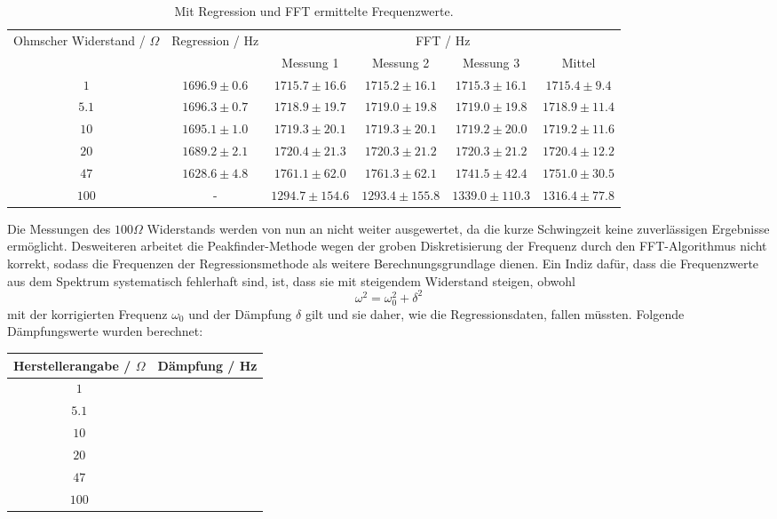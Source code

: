 \documentclass[a4paper, 12pt]{scrartcl}
\begin{document}
\begin{table}[H]
\centering
\begin{adjustbox}{width=\textwidth}
\begin{tabular}{c|c|cccc}
\multirow{2}{*}{Ohmscher Widerstand / $\Omega$} & \multirow{2}{*}{Regression / Hz} & \multicolumn{4}{c}{FFT / Hz} \\
\cline{3-6}
& & Messung 1 & Messung 2 & Messung 3 & Mittel\\
\hline
$1$ & $1696.9 \pm 0.6$ & $1715.7\pm 16.6$ & $1715.2\pm 16.1$ & $1715.3\pm 16.1$ & $1715.4\pm 9.4$\\
$5.1$ & $1696.3 \pm 0.7$ & $1718.9\pm 19.7$ & $1719.0\pm 19.8$ & $1719.0\pm 19.8$ & $1718.9\pm 11.4$\\
$10$ & $1695.1 \pm 1.0$ & $1719.3\pm 20.1$ & $1719.3\pm 20.1$ & $1719.2\pm 20.0$ & $1719.2\pm 11.6$ \\
$20$ & $1689.2 \pm 2.1$ & $1720.4\pm 21.3$ & $1720.3\pm 21.2$ & $1720.3\pm 21.2$ & $1720.4\pm 12.2$\\
$47$ & $1628.6 \pm 4.8$ & $1761.1\pm 62.0$ & $1761.3\pm 62.1$ & $1741.5\pm 42.4$ & $1751.0 \pm 30.5$\\
$100$ & - & $1294.7\pm 154.6$ & $1293.4\pm 155.8$ & $1339.0\pm 110.3$ & $1316.4 \pm 77.8$
\end{tabular}
\end{adjustbox}
\caption{Mit Regression und FFT ermittelte Frequenzwerte.}
\label{tab:freq}
\end{table}

Die Messungen des $100\Omega$ Widerstands werden von nun an nicht weiter ausgewertet, da die kurze Schwingzeit keine zuverlässigen Ergebnisse ermöglicht. Desweiteren arbeitet die Peakfinder-Methode wegen der groben Diskretisierung der Frequenz durch den FFT-Algorithmus nicht korrekt, sodass die Frequenzen der Regressionsmethode als weitere Berechnungsgrundlage dienen. Ein Indiz dafür, dass die Frequenzwerte aus dem Spektrum systematisch fehlerhaft sind, ist, dass sie mit steigendem Widerstand steigen, obwohl
$$\omega^2 = \omega_0^2 + \delta^2$$
mit der korrigierten Frequenz $\omega_0$ und der Dämpfung $\delta$ gilt und sie daher, wie die Regressionsdaten, fallen müssten. Folgende Dämpfungswerte wurden berechnet:

\begin{table}[H]
\centering
\begin{tabular}{c|c}
Herstellerangabe / $\Omega$ & Dämpfung / Hz \\
\hline
$1$ & \\
$5.1$ & \\
$10$ &  \\
$20$ & \\
$47$ & \\
$100$ & 
\end{tabular}
\end{table}
\end{document}
